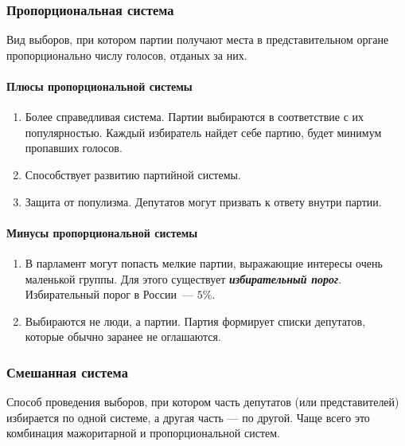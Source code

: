 \documentclass[12pt]{article}
\begin{document}
	\subsubsection{Пропорциональная система}
	\begin{definition}
		Вид выборов, при котором партии получают места в представительном органе пропорционально числу голосов, отданых за них.
	\end{definition}
	\paragraph{Плюсы пропорциональной системы}
	\begin{enumerate}
		\item Более справедливая система. Партии выбираются в соответствие с их популярностью. Каждый избиратель найдет себе партию, будет минимум пропавших голосов.
		\item Способствует развитию партийной системы.
		\item Защита от популизма. Депутатов могут призвать к ответу внутри партии.
	\end{enumerate}
	\paragraph{Минусы пропорциональной системы}
	\begin{enumerate}
		\item В парламент могут попасть мелкие партии, выражающие интересы очень маленькой группы. Для этого существует \textbf{\textit{избирательный порог}}. Избирательный порог в России~--- $5\%$.
		\item Выбираются не люди, а партии. Партия формирует списки депутатов, которые обычно заранее не оглашаются.
	\end{enumerate}
	\subsubsection{Смешанная система}
	\begin{definition}
		Способ проведения выборов, при котором часть депутатов (или представителей) избирается по одной системе, а другая часть — по другой. Чаще всего это комбинация мажоритарной и пропорциональной систем.
	\end{definition}
\end{document}

